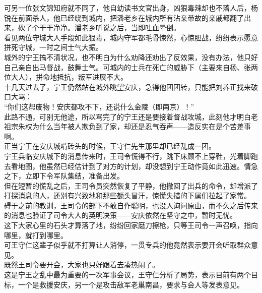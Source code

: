 \begin{multicols}{\theparacolNo}
可另一位张文锦知府就不同了，他自幼读书文官出身，凶狠毒辣却也不落人后，杨锐在前面杀人，他已经绕到城内，把潘老乡在城内所有沾亲带故的亲戚都翻了出来，砍了个干干净净。潘老乡听说之后，当即吐血晕倒。\\

看见两位守城大人手段如此狠毒，城内守军都毛骨悚然，心惊胆战，纷纷表示愿意拼死守城，一时之间士气大振。\\

城外的宁王搞不清状况，也不明白为什么劝降还劝出了反效果，没有办法，他只好自己亲自出马督战，鼓舞士气。可城内的士兵在死亡的威胁下（主要来自杨、张两位大人），拼命地抵抗，叛军进展不大。\\

十几天过去了，宁王仍然站在城外眺望安庆，急得他团团转，只能把刘养正找来破口大骂：\\

“你们这帮废物！安庆都攻不下，还说什么金陵（即南京）！”\\

此路不通，可别无他途，所以骂完了的宁王还是要接着督战攻城，此刻他才明白老祖宗朱权为什么当年被人欺负到了家，却还是忍气吞声——造反实在是个苦差事啊。\\

正当宁王在安庆城啃砖头的时候，王守仁先生那里却已经乱成一团。\\

宁王兵临安庆城下的消息传来时，王司令慌得不行，跳下床顾不上穿鞋，光着脚跑去看地图，他虽然已经估计到了对方的计划，却没想到宁王动作竟如此迅速。情急之下，立即下令军队集结，准备出发。\\

但在短暂的慌乱之后，王司令员突然恢复了平静，他撤回了出兵的命令，却增派了打探消息的人，还别有兴致地和那些额头冒汗，惊慌失措的下属们拉起了家常。\\

碍于之前的教训，王司令的部下不敢自作聪明，也没人询问原由，而不久之后传来的消息也验证了司令大人的英明决策——安庆依然在坚守之中，暂时无忧。\\

这下大家心里的石头才算落了地，纷纷回家磨刀擦枪，只等王司令一声召唤，指向哪里，就打到哪里。\\

可王守仁这辈子似乎就不打算让人消停，一贯专兵的他竟然表示要开会听取群众意见。\\

既然王司令要开会，大家也只好跟着去凑热闹了。\\

这是宁王之乱中最为重要的一次军事会议，王守仁分析了局势，表示目前有两个目标，一个是救援安庆，另一个是攻击敌军老巢南昌，要求与会人等发表意见。\\


\end{multicols}

